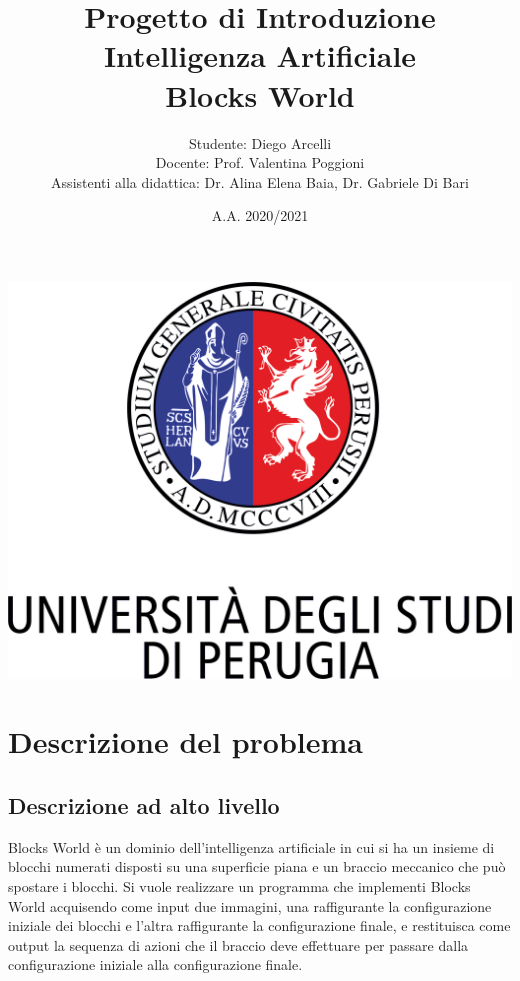 \documentclass{article}
\begin{document}
	
	\begin{titlepage}
		
		\title{Progetto di Introduzione Intelligenza Artificiale\\Blocks World}
		\author{Studente: Diego Arcelli\\Docente: Prof. Valentina Poggioni\\Assistenti alla didattica: Dr. Alina Elena Baia, Dr. Gabriele Di Bari}
		\date{A.A. 2020/2021}
		\maketitle
		
		\includegraphics[width=\linewidth]{./images/logo_unipg.png}
		
	\end{titlepage}
	
	\tableofcontents
	\newpage
	
	\section{Descrizione del problema}
	\subsection{Descrizione ad alto livello}
	Blocks World è un dominio dell'intelligenza artificiale in cui si ha un insieme di blocchi numerati disposti su una superficie piana e un braccio meccanico che può spostare i blocchi. Si vuole realizzare un programma che implementi Blocks World acquisendo come input due immagini, una raffigurante la configurazione iniziale dei blocchi e l'altra raffigurante la configurazione finale, e restituisca come output la sequenza di azioni che il braccio deve effettuare per passare dalla configurazione iniziale alla configurazione finale.
	
\end{document}
